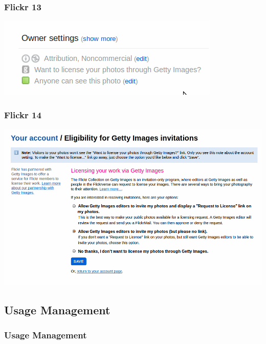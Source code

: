 \documentclass[mathserif,xcolor=dvipsnames,hyperref={bookmarks=true}]{beamer}
\begin{document}
    \begin{frame}[t]
        \frametitle{Flickr 13}
        \begin{center}
            \includegraphics[height=0.9\textheight]{want-to-license-your-photos-through-getty-images.png}
        \end{center}
    \end{frame}
    \begin{frame}[t]
        \frametitle{Flickr 14}
        \begin{center}
            \includegraphics[height=0.9\textheight]{want-to-license-your-photos-through-getty-images2.png}
        \end{center}
    \end{frame}



    \subsection{Usage Management}
    \begin{frame}[t]
        \frametitle{Usage Management}
    \end{frame}
\end{document}
